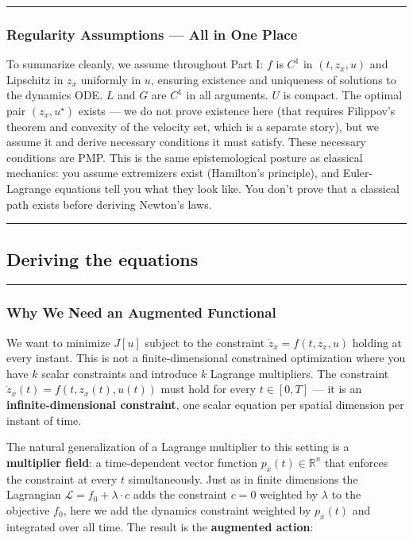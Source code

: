 \documentclass{article}
\begin{document}
\medskip\hrule\medskip

\begin{mathrequirementsbox}
\subsubsection{Regularity Assumptions --- All in One Place}

To summarize cleanly, we assume throughout Part I: $f$ is $C^1$ in $(t,z_x,u)$ and Lipschitz in $z_x$ uniformly in $u$, ensuring existence and uniqueness of solutions to the dynamics ODE. $L$ and $G$ are $C^1$ in all arguments. $U$ is compact. The optimal pair $(z_x, u^\star)$ exists — we do not prove existence here (that requires Filippov's theorem and convexity of the velocity set, which is a separate story), but we assume it and derive necessary conditions it must satisfy. These necessary conditions are PMP. This is the same epistemological posture as classical mechanics: you assume extremizers exist (Hamilton's principle), and Euler-Lagrange equations tell you what they look like. You don't prove that a classical path exists before deriving Newton's laws.
\end{mathrequirementsbox}


\medskip\hrule\medskip

\subsection{Deriving the equations}
\label{sec:augmented-action}

\medskip\hrule\medskip

\subsubsection{Why We Need an Augmented Functional}

We want to minimize $J[u]$ subject to the constraint $\dot{z}_x = f(t, z_x, u)$ holding at every instant. This is not a finite-dimensional constrained optimization where you have $k$ scalar constraints and introduce $k$ Lagrange multipliers. The constraint $\dot{z}_x(t) = f(t, z_x(t), u(t))$ must hold for every $t \in [0,T]$ — it is an \textbf{infinite-dimensional constraint}, one scalar equation per spatial dimension per instant of time.

The natural generalization of a Lagrange multiplier to this setting is a \textbf{multiplier field}: a time-dependent vector function $p_x(t) \in \mathbb{R}^n$ that enforces the constraint at every $t$ simultaneously. Just as in finite dimensions the Lagrangian $\mathcal{L} = f_0 + \lambda \cdot c$ adds the constraint $c = 0$ weighted by $\lambda$ to the objective $f_0$, here we add the dynamics constraint weighted by $p_x(t)$ and integrated over all time. The result is the \textbf{augmented action}:
\end{document}
